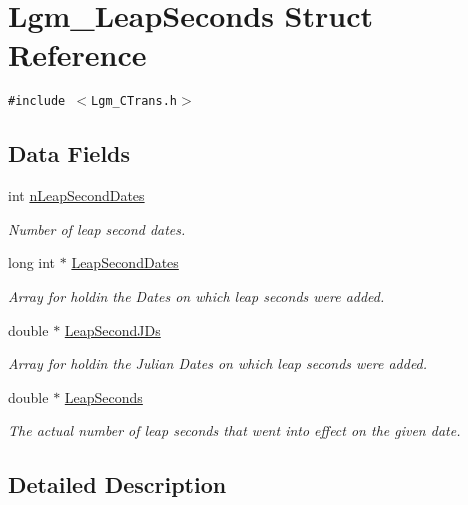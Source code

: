 \hypertarget{struct_lgm___leap_seconds}{
\section{Lgm\_\-LeapSeconds Struct Reference}
\label{struct_lgm___leap_seconds}
}
{\tt \#include $<$Lgm\_\-CTrans.h$>$}

\subsection*{Data Fields}
\begin{CompactItemize}
\item 
int \hyperlink{struct_lgm___leap_seconds_a3dde6cfdaff24850ad827b07a0730d7}{nLeapSecondDates}
\begin{CompactList}\small\item\em Number of leap second dates. \item\end{CompactList}\item 
long int $\ast$ \hyperlink{struct_lgm___leap_seconds_4369aebda8e4aea18cba6dc90d539dc7}{LeapSecondDates}
\begin{CompactList}\small\item\em Array for holdin the Dates on which leap seconds were added. \item\end{CompactList}\item 
double $\ast$ \hyperlink{struct_lgm___leap_seconds_e2bc1c43d2bc9b92f9558233db952daf}{LeapSecondJDs}
\begin{CompactList}\small\item\em Array for holdin the Julian Dates on which leap seconds were added. \item\end{CompactList}\item 
double $\ast$ \hyperlink{struct_lgm___leap_seconds_47824494de1cdaafed7bee00b27b27af}{LeapSeconds}
\begin{CompactList}\small\item\em The actual number of leap seconds that went into effect on the given date. \item\end{CompactList}\end{CompactItemize}


\subsection{Detailed Description}


